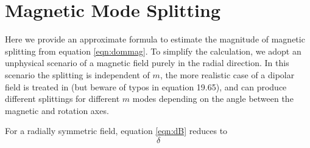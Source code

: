 \appendix

\section{Magnetic Mode Splitting}
\label{magmode}

Here we provide an approximate formula to estimate the magnitude of magnetic splitting from equation \ref{eqn:dommag}. To simplify the calculation, we adopt an unphysical scenario of a magnetic field purely in the radial direction. In this scenario the splitting is independent of $m$, the more realistic case of a dipolar field is treated in \cite{Unno_1989} (but beware of typos in equation 19.65), and can produce different splittings for different $m$ modes depending on the angle between the magnetic and rotation axes.

For a radially symmetric field, equation \ref{eqn:dB} reduces to 
\begin{equation}
\delta
\end{equation}